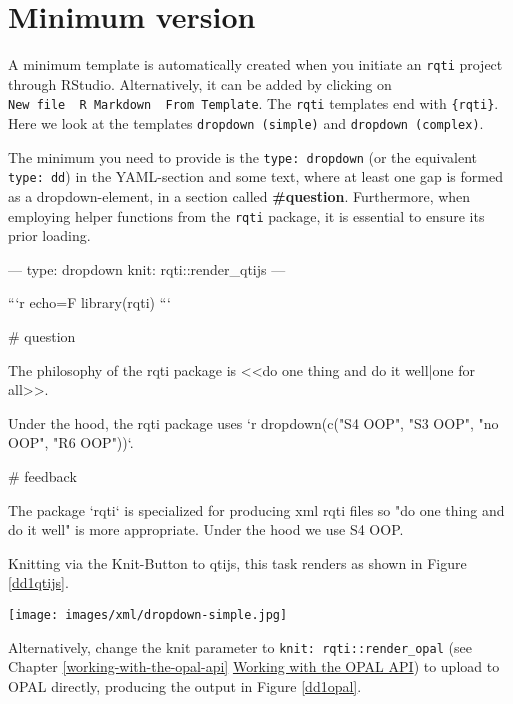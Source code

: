\documentclass[twoside]{tufte-book}
\newenvironment{Shaded}{}{}
\begin{document}
\section{Minimum version}\label{minimum-version-3}

A minimum template is automatically created when you initiate an \texttt{rqti} project through RStudio. Alternatively, it can be added by clicking on \texttt{New\ file\ \textrightarrow{}\ R\ Markdown\ \textrightarrow{}\ From\ Template}. The \texttt{rqti} templates end with \texttt{\{rqti\}}. Here we look at the templates \texttt{dropdown\ (simple)} and \texttt{dropdown\ (complex)}.

The minimum you need to provide is the \texttt{type:\ dropdown} (or the equivalent \texttt{type:\ dd}) in the YAML-section and some text, where at least one gap is formed as a dropdown-element, in a section called \textbf{\#question}. Furthermore, when employing helper functions from the \texttt{rqti} package, it is essential to ensure its prior loading.

\begin{Shaded}
\begin{Highlighting}
---
type: dropdown
knit: rqti::render_qtijs
---

```{r echo=F}
library(rqti)
```

# question

The philosophy of the rqti package is <<do one thing and do it well|one for
all>>.

Under the hood, the rqti package uses `r dropdown(c("S4 OOP", "S3 OOP", "no
OOP", "R6 OOP"))`.

# feedback

The package `rqti` is specialized for producing xml rqti files so "do one thing
and do it well" is more appropriate. Under the hood we use S4 OOP.
\end{Highlighting}
\end{Shaded}

Knitting via the Knit-Button to qtijs, this task renders as shown in Figure \ref{dd1qtijs}.

\begin{figure*}
\centering
\texttt{[image: images/xml/dropdown-simple.jpg]}
\caption{\label{dd1qtijs}Simple dropdown task rendered in qtijs}
\end{figure*}

\noindent Alternatively, change the knit parameter to \texttt{knit:\ rqti::render\_opal} (see Chapter \ref{working-with-the-opal-api} \href{api_opal.html}{Working with the OPAL API}) to upload to OPAL directly, producing the output in Figure \ref{dd1opal}.
\end{document}
